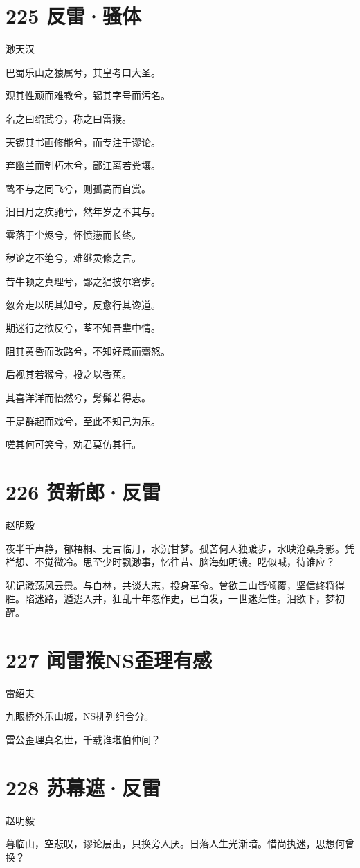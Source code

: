 \documentclass[UTF8,12pt,oneside]{ctexbook}
\def\pau#1{\begin{center} {#1} \end{center}} %
\def\poem#1#2{\section{#1}\pau{#2}} %
\begin{document}
        \newpage

        \poem{225 反雷·骚体}{渺天汉}
        \begin{center}
        巴蜀乐山之猿属兮，其皇考曰大圣。

        观其性顽而难教兮，锡其字号而污名。

        名之曰绍武兮，称之曰雷猴。

        天锡其书画修能兮，而专注于谬论。

        弃幽兰而刳朽木兮，鄙江离若粪壤。

        鸷不与之同飞兮，则孤高而自赏。

        汩日月之疾驰兮，然年岁之不其与。

        零落于尘烬兮，怀愤懑而长终。

        秽论之不绝兮，难继灵修之言。

        昔牛顿之真理兮，鄙之猖披尔窘步。

        忽奔走以明其知兮，反愈行其谗道。

        期迷行之欲反兮，荃不知吾辈中情。

        阻其黄昏而改路兮，不知好意而齌怒。

        后视其若猴兮，投之以香蕉。

        其喜洋洋而怡然兮，髣髴若得志。

        于是群起而戏兮，至此不知己为乐。

        嗟其何可笑兮，劝君莫仿其行。
        \end{center}

        \newpage

        \poem{226 贺新郎·反雷}{赵明毅}

        夜半千声静，郁梧桐、无言临月，水沉甘梦。孤苦何人独踱步，水映沧桑身影。凭栏想、不觉微冷。思至少时飘渺事，忆往昔、脑海如明镜。呓似喊，待谁应？

        犹记激荡风云景。与白林，共谈大志，投身革命。曾欲三山皆倾覆，坚信终将得胜。陷迷路，遁逃入井，狂乱十年忽作史，已白发，一世迷茫性。泪欲下，梦初醒。

        \poem{227 闻雷猴NS歪理有感}{雷绍夫}
        \begin{center}
            九眼桥外乐山城，NS排列组合分。

            雷公歪理真名世，千载谁堪伯仲间？
        \end{center}

        \poem{228 苏幕遮·反雷}{赵明毅}

        暮临山，空悲叹，谬论层出，只换旁人厌。日落人生光渐暗。惜尚执迷，思想何曾换？ 
        
\end{document}
